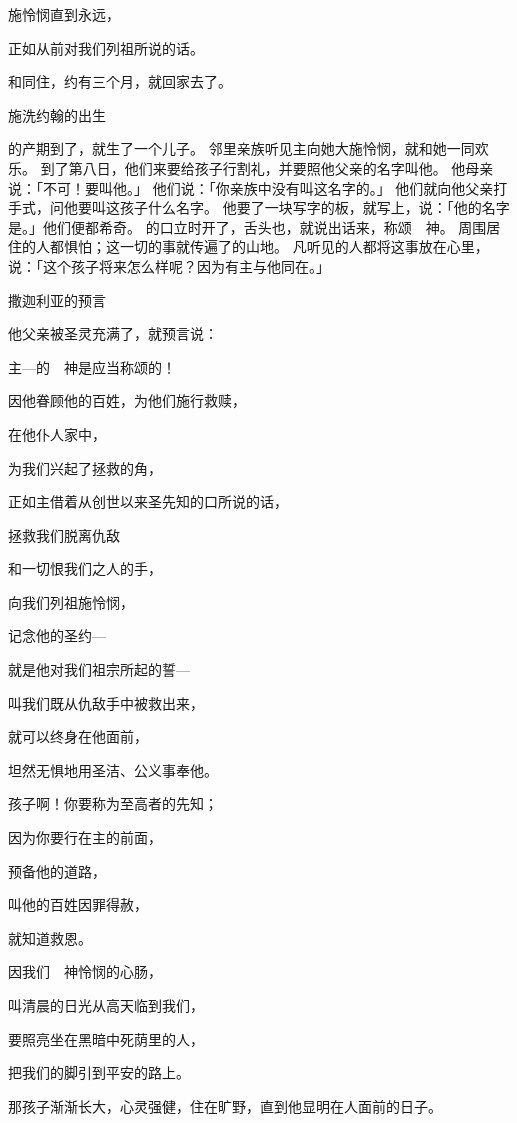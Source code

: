{\par }{\Q 施怜悯直到永远，
\par }{\Q 正如从前对我们列祖所说的话。
\par }{\PP {}和{}同住，约有三个月，就回家去了。
\par }{\SH 施洗约翰的出生
\par }{\PP {}的产期到了，就生了一个儿子。
邻里亲族听见主向她大施怜悯，就和她一同欢乐。
到了第八日，他们来要给孩子行割礼，并要照他父亲的名字叫他{}。
他母亲说：「不可！要叫他{}。」
他们说：「你亲族中没有叫这名字的。」
他们就向他父亲打手式，问他要叫这孩子什么名字。
他要了一块写字的板，就写上，说：「他的名字是{}。」他们便都希奇。
的口立时开了，舌头也{}，就说出话来，称颂　神。
周围居住的人都惧怕；这一切的事就传遍了{}的山地。
凡听见的人都将这事放在心里，说：「这个孩子将来怎么样呢？因为有主与他同在。」
\par }{\SH 撒迦利亚的预言
\par }{\PP {}他父亲{}被圣灵充满了，就预言说：
\par }{\Q {}主—{}的　神是应当称颂的！
\par }{\Q 因他眷顾他的百姓，为他们施行救赎，
\par }{\Q {}在他仆人{}家中，
\par }{\Q 为我们兴起了拯救的角，
\par }{\Q {}正如主借着从创世以来圣先知的口所说的话，
\par }{\Q {}拯救我们脱离仇敌
\par }{\Q 和一切恨我们之人的手，
\par }{\Q {}向我们列祖施怜悯，
\par }{\Q 记念他的圣约—
\par }{\Q {}就是他对我们祖宗{}所起的誓—
\par }{\Q {}叫我们既从仇敌手中被救出来，
\par }{\Q {}就可以终身在他面前，
\par }{\Q 坦然无惧地用圣洁、公义事奉他。
\par }{\Q {}孩子啊！你要称为至高者的先知；
\par }{\Q 因为你要行在主的前面，
\par }{\Q 预备他的道路，
\par }{\Q {}叫他的百姓因罪得赦，
\par }{\Q 就知道救恩。
\par }{\Q {}因我们　神怜悯的心肠，
\par }{\Q 叫清晨的日光从高天临到我们，
\par }{\Q {}要照亮坐在黑暗中死荫里的人，
\par }{\Q 把我们的脚引到平安的路上。
\par }{\PP {}那孩子渐渐长大，心灵强健，住在旷野，直到他显明在{}人面前的日子。

}
